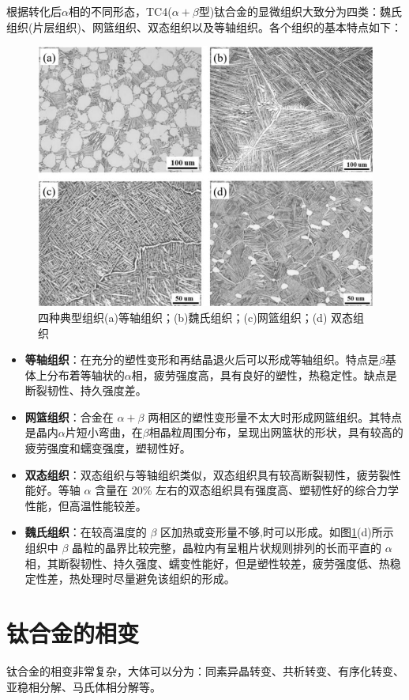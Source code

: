 根据转化后$\alpha$相的不同形态，TC4($\alpha+\beta$型)钛合金的显微组织大致分为四类：魏氏组织(片层组织)、网篮组织、双态组织以及等轴组织。各个组织的基本特点如下：
\begin{figure}[h!]
	\centering
	\includegraphics[width=0.7\linewidth]{pic/四种典型组织}
	\caption{四种典型组织(a)等轴组织；(b)魏氏组织；(c)网篮组织；(d) 双态组织}
	\label{fig:classic}
\end{figure}

\begin{itemize}
	\item 	\textbf{等轴组织}：在充分的塑性变形和再结晶退火后可以形成等轴组织。特点是$ \beta $基体上分布着等轴状的$ \alpha $相，疲劳强度高，具有良好的塑性，热稳定性。缺点是断裂韧性、持久强度差。
	\item 	\textbf{网篮组织}：合金在 $\alpha+\beta$ 两相区的塑性变形量不太大时形成网篮组织。其特点是晶内$ \alpha $片短小弯曲，在$ \beta $相晶粒周围分布，呈现出网篮状的形状，具有较高的疲劳强度和蠕变强度，塑韧性好。
	\item 	\textbf{双态组织}：双态组织与等轴组织类似，双态组织具有较高断裂韧性，疲劳裂性能好。等轴 $\alpha$ 含量在 $20 \%$ 左右的双态组织具有强度高、塑韧性好的综合力学性能，但高温性能较差。
	\item 	\textbf{魏氏组织}：在较高温度的 $\beta$ 区加热或变形量不够,时可以形成。如图\ref{fig:classic}(d)所示组织中 $\beta$ 晶粒的晶界比较完整，晶粒内有呈粗片状规则排列的长而平直的 $ \alpha $相，其断裂韧性、持久强度、蠕变性能好，但是塑性较差，疲劳强度低、热稳定性差，热处理时尽量避免该组织的形成。
\end{itemize}

\section{钛合金的相变}
钛合金的相变非常复杂，大体可以分为：同素异晶转变、共析转变、有序化转变、亚稳相分解、马氏体相分解等。

